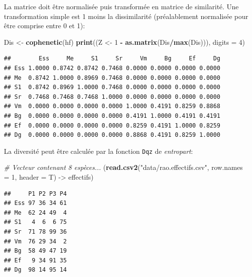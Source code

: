 \documentclass[
  11pt,
  french,
  a4paper,
  extrafontsizes,onecolumn,openright
  ]{memoir}
\newenvironment{Shaded}{\begin{snugshade}}{\end{snugshade}}
\newcommand{\AttributeTok}[1]{\textcolor[rgb]{0.13,0.29,0.53}{#1}}
\newcommand{\CommentTok}[1]{\textcolor[rgb]{0.56,0.35,0.01}{\textit{#1}}}
\newcommand{\DecValTok}[1]{\textcolor[rgb]{0.00,0.00,0.81}{#1}}
\newcommand{\FunctionTok}[1]{\textcolor[rgb]{0.13,0.29,0.53}{\textbf{#1}}}
\newcommand{\NormalTok}[1]{#1}
\newcommand{\OtherTok}[1]{\textcolor[rgb]{0.56,0.35,0.01}{#1}}
\newcommand{\SpecialCharTok}[1]{\textcolor[rgb]{0.81,0.36,0.00}{\textbf{#1}}}
\newcommand{\StringTok}[1]{\textcolor[rgb]{0.31,0.60,0.02}{#1}}
\begin{document}
\normalsize

La matrice doit être normalisée puis transformée en matrice de similarité.
Une transformation simple est 1 moins la dissimilarité (préalablement normalisée pour être comprise entre 0 et 1):

\scriptsize

\begin{Shaded}
\begin{Highlighting}[]
\NormalTok{Dis }\OtherTok{\textless{}{-}} \FunctionTok{cophenetic}\NormalTok{(hf)}
\FunctionTok{print}\NormalTok{((Z }\OtherTok{\textless{}{-}} \DecValTok{1} \SpecialCharTok{{-}} \FunctionTok{as.matrix}\NormalTok{(Dis}\SpecialCharTok{/}\FunctionTok{max}\NormalTok{(Dis))), }\AttributeTok{digits =} \DecValTok{4}\NormalTok{)}
\end{Highlighting}
\end{Shaded}

\begin{verbatim}
##        Ess     Me     S1     Sr     Vm     Bg     Ef     Dg
## Ess 1.0000 0.8742 0.8742 0.7468 0.0000 0.0000 0.0000 0.0000
## Me  0.8742 1.0000 0.8969 0.7468 0.0000 0.0000 0.0000 0.0000
## S1  0.8742 0.8969 1.0000 0.7468 0.0000 0.0000 0.0000 0.0000
## Sr  0.7468 0.7468 0.7468 1.0000 0.0000 0.0000 0.0000 0.0000
## Vm  0.0000 0.0000 0.0000 0.0000 1.0000 0.4191 0.8259 0.8868
## Bg  0.0000 0.0000 0.0000 0.0000 0.4191 1.0000 0.4191 0.4191
## Ef  0.0000 0.0000 0.0000 0.0000 0.8259 0.4191 1.0000 0.8259
## Dg  0.0000 0.0000 0.0000 0.0000 0.8868 0.4191 0.8259 1.0000
\end{verbatim}

\normalsize

La diversité peut être calculée par la fonction \texttt{Dqz} de \emph{entropart}:

\scriptsize

\begin{Shaded}
\begin{Highlighting}[]
\CommentTok{\# Vecteur contenant 8 espèces...}
\NormalTok{(}\FunctionTok{read.csv2}\NormalTok{(}\StringTok{"data/rao.effectifs.csv"}\NormalTok{, }\AttributeTok{row.names =} \DecValTok{1}\NormalTok{, }\AttributeTok{header =}\NormalTok{ T) }\OtherTok{{-}\textgreater{}}
\NormalTok{    effectifs)}
\end{Highlighting}
\end{Shaded}

\begin{verbatim}
##     P1 P2 P3 P4
## Ess 97 36 34 61
## Me  62 24 49  4
## S1   4  6  6 75
## Sr  71 78 99 36
## Vm  76 29 34  2
## Bg  58 49 47 19
## Ef   9 34 91 35
## Dg  98 14 95 14
\end{verbatim}
\end{document}
